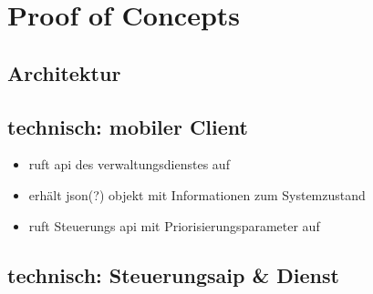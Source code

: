 \chapter{Proof of Concepts}

\begin{comment}
Die Proof of Concepts lassen sich evtl. aus den Risiken ableiten. Für die Spezifizierung der Proof of Concepts müssen jeweils Exit- und Failkriterien beschrieben werden. D.h. es werden konkrete Bedingungen spezifiziert, die besagen in welchem Fall ein Proof of Concept als "erfolgreich" oder als "nicht erfolgreich" gilt. Falls ein Proof of Concept gescheitert ist, muss man sich im Vorfeld Alternativen/Fallbacks überlegen, die anstelle der ursprünglich angedachten Vorgehensweise herangezogen werden könnten. Die Durchführung eines Proof of Concepts muss dokumentiert werden. 
\end{comment}


\section{Architektur}


\section{technisch: mobiler Client}

\begin{itemize}
\item ruft api des verwaltungsdienstes auf
\item erhält json(?) objekt mit Informationen zum Systemzustand
\item ruft Steuerungs api mit Priorisierungsparameter auf
\end{itemize}


\section{technisch: Steuerungsaip & Dienst}